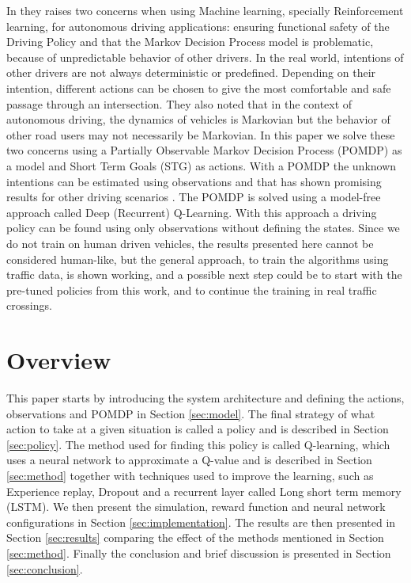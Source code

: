 In \cite{Shalev-ShwartzSafeDriving} they raises two concerns when using Machine learning, specially Reinforcement learning, for autonomous driving applications: ensuring functional safety of the Driving Policy and that the Markov Decision Process model is problematic, because of unpredictable behavior of other drivers.
In the real world, intentions of other drivers are not always deterministic or predefined. Depending on their intention, different actions can be chosen to give the most comfortable and safe passage through an intersection.
They also noted that in the context of autonomous driving, the dynamics of vehicles is Markovian but the behavior of other road users may not necessarily be Markovian. In this paper we solve these two concerns using a Partially Observable Markov Decision Process (POMDP) as a model and Short Term Goals (STG) as actions. With a POMDP the unknown intentions can be estimated using observations and that has shown promising results for other driving scenarios \cite{BrechtelProbabilisticPOMDPs}. The POMDP is solved using a model-free approach called Deep (Recurrent) Q-Learning. With this approach a driving policy can be found using only observations without defining the states. Since we do not train on human driven vehicles, the results presented here cannot be considered  human-like, but the general approach, to train the algorithms using traffic data, is shown working, and  a possible next step could be to start with the pre-tuned policies from this work, and to continue the training in real traffic crossings.

\section{Overview}
This paper starts by introducing the system architecture and defining the actions, observations and POMDP in Section \ref{sec:model}. The final strategy of what action to take at a given situation is called a policy and is described in Section \ref{sec:policy}. The method used for finding this policy is called Q-learning, which uses a neural network to approximate a Q-value and is described in Section \ref{sec:method} together with techniques used to improve the learning, such as Experience replay, Dropout and a recurrent layer called Long short term memory (LSTM). We then present the simulation, reward function and neural network configurations in Section \ref{sec:implementation}. The results are then presented in Section \ref{sec:results} comparing the effect of the methods mentioned in Section \ref{sec:method}. Finally the conclusion and brief discussion is presented in Section \ref{sec:conclusion}.


